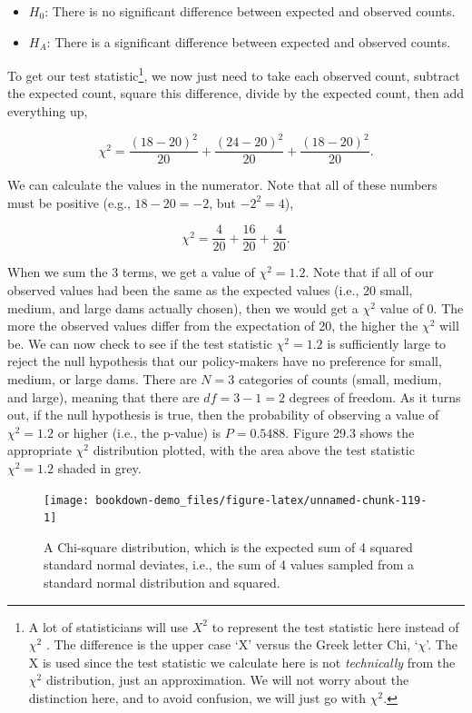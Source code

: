 \documentclass[
  openany]{scrbook}
\providecommand{\tightlist}{%
  \setlength{\itemsep}{0pt}\setlength{\parskip}{0pt}}
\begin{document}
\begin{itemize}
\tightlist
\item
  \(H_{0}\): There is no significant difference between expected and observed counts.
\item
  \(H_{A}\): There is a significant difference between expected and observed counts.
\end{itemize}

To get our test statistic\footnote{A lot of statisticians will use \(X^{2}\) to represent the test statistic here instead of \(\chi^{2}\) \citep{Sokal1995}. The difference is the upper case `X' versus the Greek letter Chi, `\(\chi\)'. The X is used since the test statistic we calculate here is not \emph{technically} from the \(\chi^{2}\) distribution, just an approximation. We will not worry about the distinction here, and to avoid confusion, we will just go with \(\chi^{2}\).}, we now just need to take each observed count, subtract the expected count, square this difference, divide by the expected count, then add everything up,

\[\chi^{2} = \frac{(18 - 20)^{2}}{20} + \frac{(24 - 20)^{2}}{20} + \frac{(18 - 20)^{2}}{20}.\]

We can calculate the values in the numerator.
Note that all of these numbers must be positive (e.g., \(18 - 20 = -2\), but \(-2^{2} = 4\)),

\[\chi^{2} = \frac{4}{20} + \frac{16}{20} + \frac{4}{20}.\]

When we sum the 3 terms, we get a value of \(\chi^{2} = 1.2\).
Note that if all of our observed values had been the same as the expected values (i.e., 20 small, medium, and large dams actually chosen), then we would get a \(\chi^{2}\) value of 0.
The more the observed values differ from the expectation of 20, the higher the \(\chi^{2}\) will be.
We can now check to see if the test statistic \(\chi^{2} = 1.2\) is sufficiently large to reject the null hypothesis that our policy-makers have no preference for small, medium, or large dams.
There are \(N = 3\) categories of counts (small, medium, and large), meaning that there are \(df = 3 - 1 = 2\) degrees of freedom.
As it turns out, if the null hypothesis is true, then the probability of observing a value of \(\chi^{2} = 1.2\) or higher (i.e., the p-value) is \(P = 0.5488\).
Figure 29.3 shows the appropriate \(\chi^{2}\) distribution plotted, with the area above the test statistic \(\chi^{2} = 1.2\) shaded in grey.

\begin{figure}
\texttt{[image: bookdown-demo\_files/figure-latex/unnamed-chunk-119-1]} \caption{A Chi-square distribution, which is the expected sum of 4 squared standard normal deviates, i.e., the sum of 4 values sampled from a standard normal distribution and squared.}\label{fig:unnamed-chunk-119}
\end{figure}
\end{document}
